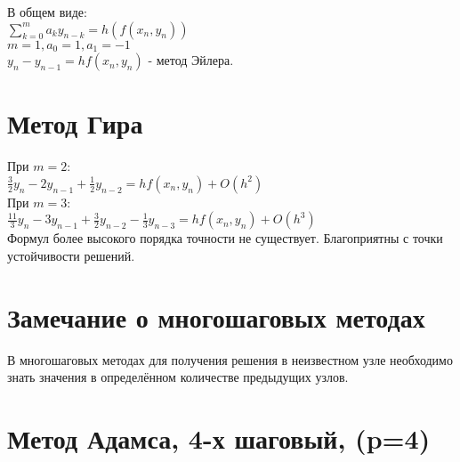 В общем виде:\\
$\sum\limits_{k=0}^{m} a_{k} y_{n - k} = h(f(x_{n}, y_{n}))$\\
$m = 1, a_{0} = 1, a_{1} = -1$\\
$y_{n} - y_{n - 1} = h f (x_{n}, y_{n})$ - метод Эйлера.\\

\section{Метод Гира}
При $m = 2$:\\
$\frac{3}{2} y_{n} - 2 y_{n-1} + \frac{1}{2}y_{n-2} = h f (x_{n}, y_{n}) + O(h^{2})$\\
При $m = 3$:\\
$\frac{11}{3}y_{n} - 3y_{n-1} + \frac{3}{2}y_{n-2} - \frac{1}{3}y_{n-3} = h f(x_{n}, y_{n}) + O(h^{3})$\\

Формул более высокого порядка точности не существует. Благоприятны с точки устойчивости решений.

\section{Замечание о многошаговых методах}
В многошаговых методах для получения решения в неизвестном узле необходимо знать значения в определённом количестве предыдущих узлов.

\section{Метод Адамса, 4-х шаговый, (p=4)}







